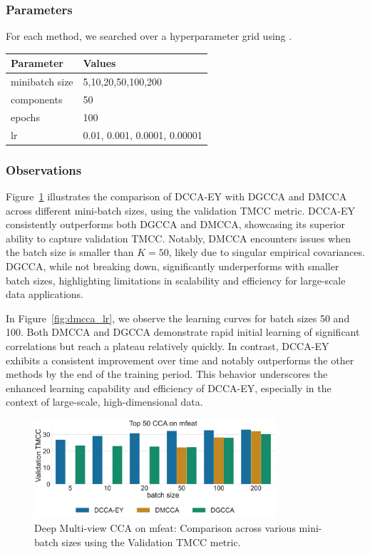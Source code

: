 \subsubsection{Parameters} For each method, we searched over a hyperparameter grid using \citet{wandb}.

\begin{table}[h!]
    \centering
    \begin{tabular}{|l|l|}
        \hline Parameter      & Values                       \\
        \hline minibatch size & 5,10,20,50,100,200           \\
        \hline components     & 50                           \\
        \hline epochs         & 100                          \\
        \hline lr             & 0.01, 0.001, 0.0001, 0.00001 \\
        \hline
    \end{tabular}
\end{table}

\subsubsection{Observations}
Figure~\ref{fig:dmcca_corr} illustrates the comparison of DCCA-EY with DGCCA and DMCCA across different mini-batch sizes, using the validation TMCC metric.
DCCA-EY consistently outperforms both DGCCA and DMCCA, showcasing its superior ability to capture validation TMCC. Notably, DMCCA encounters issues when the batch size is smaller than $K=50$, likely due to singular empirical covariances.
DGCCA, while not breaking down, significantly underperforms with smaller batch sizes, highlighting limitations in scalability and efficiency for large-scale data applications.

In Figure~\ref{fig:dmcca_lr}, we observe the learning curves for batch sizes 50 and 100. Both DMCCA and DGCCA demonstrate rapid initial learning of significant correlations but reach a plateau relatively quickly. In contrast, DCCA-EY exhibits a consistent improvement over time and notably outperforms the other methods by the end of the training period. This behavior underscores the enhanced learning capability and efficiency of DCCA-EY, especially in the context of large-scale, high-dimensional data.

\begin{figure}
    \centering
    \includegraphics[width=0.8\textwidth]{figures/DMCCA/mfeat_models_different_batch_sizes}
    \caption{Deep Multi-view CCA on mfeat: Comparison across various mini-batch sizes using the Validation TMCC metric.}\label{fig:dmcca_corr}
\end{figure}

